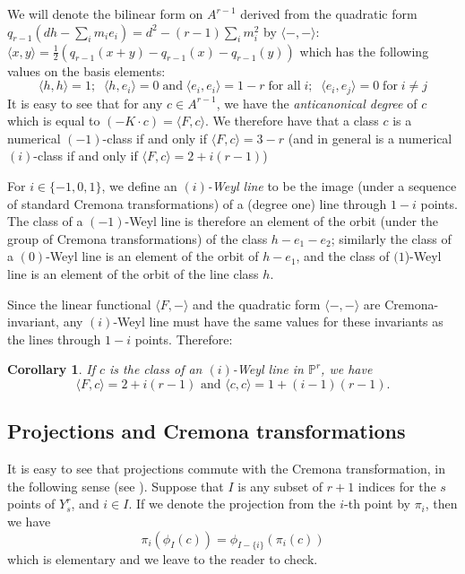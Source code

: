 \documentclass[12pt]{article}
\numberwithin{equation}{section}
\newtheorem{corollary}[equation]{Corollary}
\numberwithin{equation}{section}
\numberwithin{subeq}{equation}
\def\bbP{\mathbb{P}}
\begin{document}
We will denote the  bilinear form on $A^{r-1}$ 
derived from the quadratic form 
$q_{r-1}(dh-\sum_i m_i e_i) = d^2-(r-1)\sum_i m_i^2$
by $\langle -,-\rangle$:
$
\langle x, y \rangle = \frac{1}{2}(q_{r-1}(x+y)-q_{r-1}(x)-q_{r-1}(y))
$
which has the following values on the basis elements:
\[
\langle h,h\rangle = 1; \;\;
\langle h,e_i\rangle = 0 
\;\text{and}\;\langle e_i,e_i \rangle = 1-r \;\text{for all}\;i;
\;\; \langle e_i,e_j\rangle =0 \;\text{for}\; i \neq j
\]
It is easy to see that for any $c \in A^{r-1}$, we have
the \emph{anticanonical degree} of $c$ which is equal to
$(-K\cdot c) = \langle F , c\rangle$.
We therefore have that a class $c$ is a numerical $(-1)$-class
if and only if $\langle F, c\rangle = 3-r$
(and in general is a numerical $(i)$-class if and only if
$\langle F, c\rangle = 2+i(r-1)$)

For $i \in \{-1,0,1\}$,
we define an \emph{$(i)$-Weyl line}
to be the image
(under a sequence of standard Cremona transformations)
of a (degree one) line through $1-i$ points.
The class of a $(-1)$-Weyl line is therefore an element of the orbit
(under the group of Cremona transformations)
of the class $h-e_1-e_2$;
similarly the class of a $(0)$-Weyl line is an element of the orbit of $h-e_1$,
and the class of  $(1$)-Weyl line is an element of the orbit of the line class $h$.

Since the linear functional $\langle F, - \rangle$
and the quadratic form $\langle -,-\rangle$
are Cremona-invariant,
any $(i)$-Weyl line must have the same values for these invariants
as the lines through $1-i$ points.
Therefore:
\begin{corollary}\label{iWeyllineinvariants}
If $c$ is the class of an $(i)$-Weyl line in $\bbP^r$, we have
\[
\langle F, c \rangle = 2+i(r-1) \text{ and } \langle c, c \rangle = 1 + (i-1)(r-1).
\]
\end{corollary}

\subsection{Projections and Cremona transformations}\label{projectionsCremona}

It is easy to see that projections commute with the Cremona transformation, 
in the following sense (see \cite{DM2}).
Suppose that $I$ is any subset of $r+1$ indices for the $s$ points of $Y^r_s$,
and $i \in I$. 
If we denote the projection from the $i$-th point by $\pi_i$,
then we have
\[
\pi_i(\phi_I(c)) = \phi_{I-\{i\}}(\pi_i(c))
\]
which is elementary and we leave to the reader to check.
\end{document}

